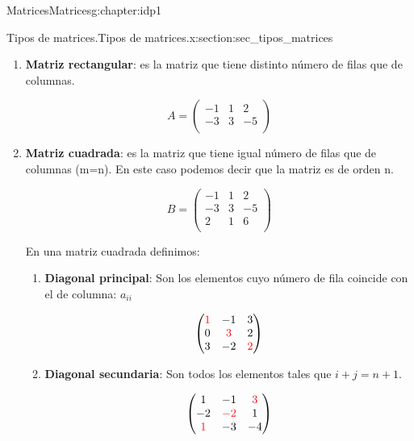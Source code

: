 \documentclass[oneside,12pt,]{book}
\newcommand{\terminology}[1]{\textbf{#1}}
\newcommand{\amp}{&}
\begin{document}
\begin{chapterptx}{Matrices}{}{Matrices}{}{}{g:chapter:idp1}
\begin{sectionptx}{Tipos de matrices.}{}{Tipos de matrices.}{}{}{x:section:sec_tipos_matrices}
\begin{enumerate}[label=\alph*]
%
\item{}\terminology{Matriz rectangular}: es la matriz que tiene distinto número de filas que de columnas.%
\par
%
\begin{equation*}
A= \begin{pmatrix}  -1 \amp 1  \amp 2  \\  -3  \amp 3 \amp -5 \\\end{pmatrix}
\end{equation*}
%
\item{}\terminology{Matriz cuadrada}: es la matriz que tiene igual número de filas que de columnas (m=n). En este caso podemos decir que la matriz es de orden n.%
\par
%
\begin{equation*}
B= \begin{pmatrix}  -1 \amp 1  \amp 2  \\  -3  \amp 3 \amp -5 \\  2  \amp 1 \amp 6 \\\end{pmatrix}
\end{equation*}
%
\par
En una matriz cuadrada definimos:%
\par
%
\begin{enumerate}[label=(\roman*)]
\item{}\terminology{Diagonal principal}: Son los elementos cuyo número de fila coincide con el de columna: \(a_{ii}\)%
\par
%
\begin{equation*}
\begin{pmatrix} 
\color{red} 1 \amp -1 \amp 3   \\
0 \amp \color{red}3 \amp 2  \\
3 \amp -2  \amp \color{red}2  \\ 
\end{pmatrix} 
\end{equation*}
%
\item{}\terminology{Diagonal secundaria}: Son todos los elementos tales que \(i+j=n+1\).%
\par
%
\begin{equation*}
\begin{pmatrix} 
1 \amp -1 \amp \color{red} 3   \\
-2 \amp \color{red}{-2} \amp 1   \\
\color{red} 1 \amp -3  \amp -4  \\ 
\end{pmatrix} 

\end{equation*}
\end{enumerate}
\end{enumerate}
\end{sectionptx}
\end{chapterptx}
\end{document}
